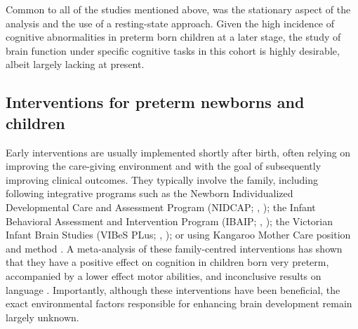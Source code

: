Common to all of the studies mentioned above, was the stationary aspect of the analysis and the use of a resting-state approach. 
Given the high incidence of cognitive abnormalities in preterm born children at a later stage, the study of brain function under specific cognitive tasks in this cohort is highly desirable, albeit largely lacking at present.

\subsection{Interventions for preterm newborns and children}

Early interventions are usually implemented shortly after birth, often relying on improving the care-giving environment and with the goal of subsequently improving clinical outcomes. They typically involve the family, including following integrative programs such as the Newborn Individualized Developmental Care and Assessment Program (NIDCAP; \citeauthor{Peters2009}, \citeyear{Peters2009}); the Infant Behavioral Assessment and Intervention Program (IBAIP; \citeauthor{VanHus2016}, \citeyear{VanHus2016}); the Victorian Infant Brain Studies (VIBeS PLus; \citeauthor{Spittle2018}, \citeyear{Spittle2018}); or using Kangaroo Mother Care position and method \citep{Peters2009}. A meta-analysis of these family-centred interventions has shown that they have a positive effect on cognition in children born very preterm, accompanied by a lower effect motor abilities, and inconclusive results on language \citep{Ferreira2020}. Importantly, although these interventions have been beneficial, the exact environmental factors responsible for enhancing brain development remain largely unknown. 


